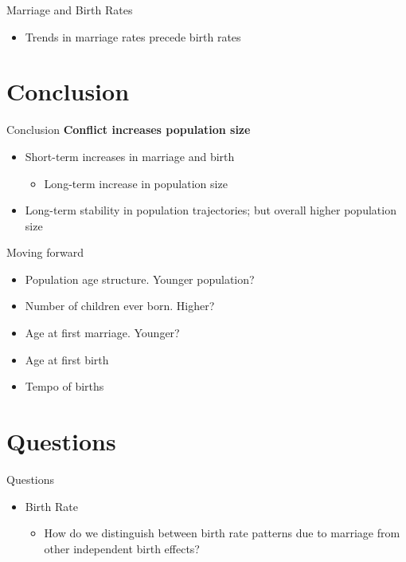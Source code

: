 \documentclass{beamer}
\begin{document}
\begin{frame}{Marriage and Birth Rates}
			\begin{itemize}
				\item Trends in marriage rates precede birth rates
			\end{itemize}
		\end{frame}

\section{Conclusion}

	\begin{frame}{Conclusion}
		\textbf{Conflict increases population size}
		\begin{itemize}
			\item Short-term increases in marriage and birth
				\begin{itemize} 
					\item Long-term increase in population size
				\end{itemize}
			\item Long-term stability in population trajectories; but overall higher population size
		\end{itemize}
	\end{frame}
	
	\begin{frame}{Moving forward}
		\begin{itemize}
			\item Population age structure. Younger population? 
			\item Number of children ever born. Higher?
			\item Age at first marriage. Younger?
			\item Age at first birth
			\item Tempo of births
		\end{itemize}
	\end{frame}

\section{Questions}
	\begin{frame}{Questions}
		\begin{itemize}
			\item Birth Rate
				\begin{itemize}
					\item How do we distinguish between birth rate patterns due to marriage from other independent birth effects?
				\end{itemize}			
		\end{itemize}
	\end{frame}
\end{document}
